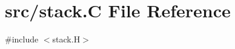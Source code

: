 \hypertarget{stack_8_c}{}\section{src/stack.C File Reference}
\label{stack_8_c}
{\ttfamily \#include $<$stack.\+H$>$}\newline
